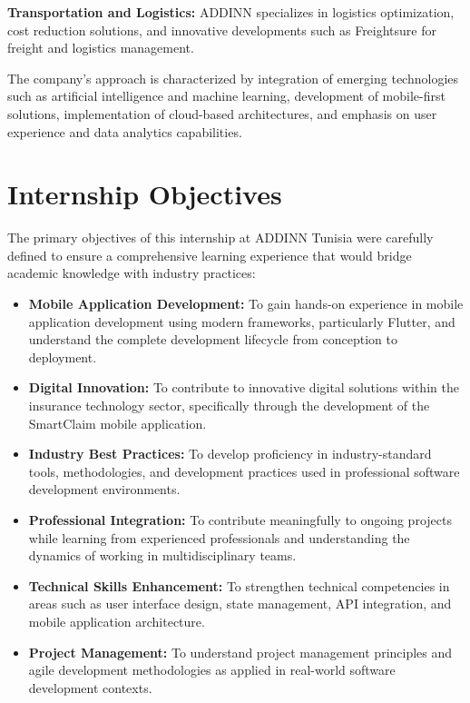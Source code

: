 \documentclass[12pt,a4paper]{report}
\begin{document}
\textbf{Transportation and Logistics:} ADDINN specializes in logistics optimization, cost reduction solutions, and innovative developments such as Freightsure for freight and logistics management.

The company's approach is characterized by integration of emerging technologies such as artificial intelligence and machine learning, development of mobile-first solutions, implementation of cloud-based architectures, and emphasis on user experience and data analytics capabilities.

\section{Internship Objectives}

The primary objectives of this internship at ADDINN Tunisia were carefully defined to ensure a comprehensive learning experience that would bridge academic knowledge with industry practices:

\begin{itemize}
    \item \textbf{Mobile Application Development:} To gain hands-on experience in mobile application development using modern frameworks, particularly Flutter, and understand the complete development lifecycle from conception to deployment.
    
    \item \textbf{Digital Innovation:} To contribute to innovative digital solutions within the insurance technology sector, specifically through the development of the SmartClaim mobile application.
    
    \item \textbf{Industry Best Practices:} To develop proficiency in industry-standard tools, methodologies, and development practices used in professional software development environments.
    
    \item \textbf{Professional Integration:} To contribute meaningfully to ongoing projects while learning from experienced professionals and understanding the dynamics of working in multidisciplinary teams.
    
    \item \textbf{Technical Skills Enhancement:} To strengthen technical competencies in areas such as user interface design, state management, API integration, and mobile application architecture.
    
    \item \textbf{Project Management:} To understand project management principles and agile development methodologies as applied in real-world software development contexts.
\end{itemize}
\end{document}
